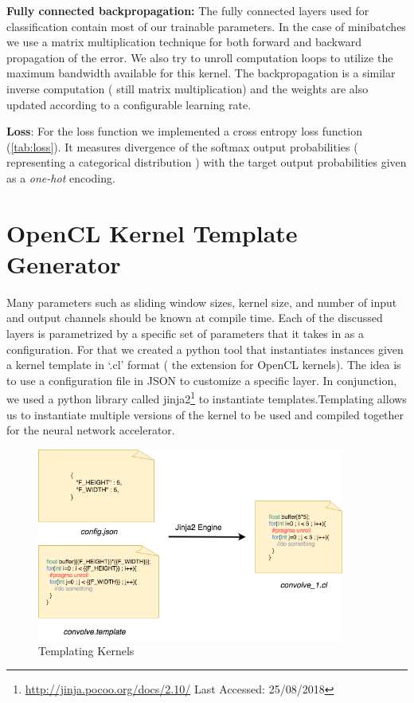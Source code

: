 \textbf{Fully connected backpropagation:} The fully connected layers used for classification contain most of our trainable parameters. In the case of minibatches we use a matrix multiplication technique for both forward and backward propagation of the error. We also try to unroll computation loops to utilize the maximum bandwidth available for this kernel. The backpropagation is a similar inverse computation ( still matrix multiplication)  and the weights are also updated according to a configurable learning rate.

\textbf{Loss}: For the loss function we implemented a cross entropy loss function (\ref{tab:loss}). It measures divergence of the softmax output probabilities ( representing a categorical distribution ) with the target output probabilities given as a \emph{one-hot} encoding.

\section{OpenCL Kernel Template Generator}

Many parameters such as sliding window sizes, kernel size, and number of input and output channels should be known at compile time. Each of the discussed layers is parametrized by a specific set of parameters that it takes in as a configuration. For that we created a python tool that instantiates instances  given a kernel template in ‘.cl’ format ( the extension for OpenCL kernels). The idea is to use a configuration file in JSON to customize a specific layer. In conjunction, we used a python library called jinja2\footnote{\url{http://jinja.pocoo.org/docs/2.10/} Last Accessed: 25/08/2018} to instantiate templates.Templating allows us to instantiate multiple versions of the kernel to be used and compiled together for the neural network accelerator.


\begin{figure}[h!]
\centering
\includegraphics[width=0.9\textwidth]{Figures/jinja}
\decoRule
\caption[Templating Kernels]{ Templating Kernels }
\label{fig:jinja}
\end{figure}

